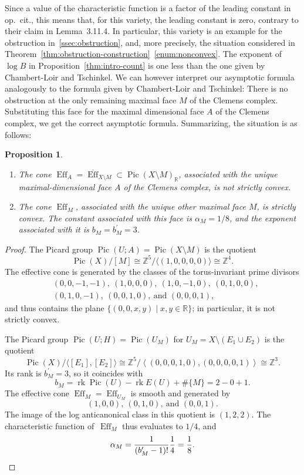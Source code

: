 \documentclass[a4paper, twoside, 10pt]{amsart}
\newcommand{\RR}{\mathbb{R}}
\newcommand{\ZZ}{\mathbb{Z}}
\DeclareMathOperator{\Eff}{Eff}
\DeclareMathOperator{\Pic}{Pic}
\DeclareMathOperator{\rk}{rk}
\newtheorem{proposition}[theorem]{Proposition}
\theoremstyle{definition}
\begin{document}
Since a value of the characteristic function is a factor of the leading constant in op.\ cit., this means that, for this variety, the leading constant is zero, contrary to their claim in Lemma~3.11.4.
In particular, this variety is an example for the obstruction in~\ref{ssec:obstruction}, and, more precisely, the situation considered in Theorem~\ref{thm:obstruction-construction}~\eqref{enum:nonconvex}.
The exponent of $\log B$ in Proposition~\ref{thm:intro-count} is one less than the one given by Chambert-Loir and Tschinkel. We can however interpret our asymptotic formula analogously to the formula given by Chambert-Loir and Tschinkel: There is no obstruction at the only remaining maximal face $M$ of the Clemens complex. Substituting this face for the maximal dimensional face $A$ of the Clemens complex, we get the correct asymptotic formula.
Summarizing, the situation is as follows:

\begin{proposition}\label{prop:toric-interpretation}
  \leavevmode

  \begin{enumerate}
    \item The cone $\Eff_A=\overline{\Eff}_{X\setminus M}\subset\Pic(X\setminus M)_\RR$, associated with the unique maximal-dimensional face $A$ of the Clemens complex, is not strictly convex.

    \item The cone $\Eff_M$, associated with the unique other maximal face $M$, is strictly convex.
    The constant associated with this face is $\alpha_M=1/8$, and the exponent associated with it is $b_M=b^\prime_M=3$.
  \end{enumerate}
\end{proposition}
\begin{proof}
  The Picard group $\Pic(U;A)=\Pic(X\setminus M)$ is the quotient
  \[
    \Pic(X)/[M] \cong \ZZ^5/\langle (1,0,0,0,0) \rangle \cong \ZZ^4.
  \]
  The effective cone is generated by the classes of the torus-invariant prime divisors
  \begin{align*}
    &(0,0,-1,-1),\ (1,0,0,0),\ (1,0,-1,0),\ (0,1,0,0),\\
    &(0,1,0,-1),\ (0,0,1,0),\ \text{and } (0,0,0,1),
  \end{align*}
  and thus contains the plane $\{(0,0,x,y)\mid x,y\in \RR\}$; in particular, it is not strictly convex.

  The Picard group $\Pic(U;H)=\Pic(U_M)$ for $U_M=X\setminus (E_1\cup E_2)$ is the quotient
  \[
    \Pic(X)/\langle[E_1],[E_2]\rangle \cong \ZZ^5/\left\langle(0, 0, 0, 1, 0),(0, 0, 0, 0, 1)\right\rangle
    \cong \ZZ^3\text{.}
  \]
  Its rank is $b_M^\prime=3$, so it coincides with
  \[
    b_M=\rk\Pic(U) - \rk E(U) + \# \{M\} = 2 - 0 + 1.
  \]
  The effective cone $\Eff_M=\Eff_{U_M}$ is smooth and generated by
  \[
    (1,0,0),\ (0,1,0),\ \text{and } (0,0,1).
  \]
  The image of the log anticanonical class in this quotient is $(1,2,2)$. The characteristic function of~$\Eff_M$ thus evaluates to $1/4$, and 
  \[
    \alpha_M=\frac{1}{(b_M^\prime -1)!} \frac{1}{4} = \frac{1}{8}.\qedhere
  \]
\end{proof}
\end{document}
